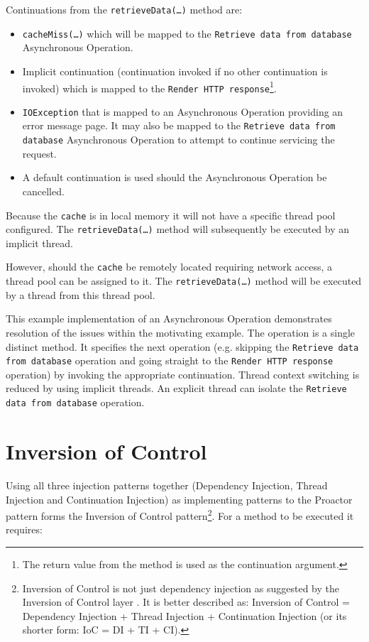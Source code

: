 \documentclass[prodmode]{style/acmlarge}
\begin{document}
Continuations from the \texttt{retrieveData(\ldots)} method are:
\begin{itemize}
  \item \texttt{cacheMiss(\ldots)} which will be mapped to the \texttt{Retrieve data from database} Asynchronous Operation.
  \item Implicit continuation (continuation invoked if no other continuation is invoked) which is mapped to the \texttt{Render HTTP response}\footnote{The return value from the method is used as the continuation argument.}.
  \item \texttt{IOException} that is mapped to an Asynchronous Operation providing an error message page.  It may also be mapped to the \texttt{Retrieve data from database} Asynchronous Operation to attempt to continue servicing the request.
  \item A default continuation is used should the Asynchronous Operation be cancelled.
\end{itemize}

Because the \texttt{cache} is in local memory it will not have a specific thread
pool configured.  The \texttt{retrieveData(\ldots)} method will subsequently be
executed by an implicit thread.

However, should the \texttt{cache} be remotely located requiring network access,
a thread pool can be assigned to it.  The \texttt{retrieveData(\ldots)} method
will be executed by a thread from this thread pool.

This example implementation of an Asynchronous Operation demonstrates resolution
of the issues within the motivating example.  The operation is a single distinct
method.  It specifies the next operation (e.g. skipping the \texttt{Retrieve
data from database} operation and going straight to the \texttt{Render HTTP
response} operation) by invoking the appropriate continuation.  Thread context
switching is reduced by using implicit threads.  An explicit thread can isolate the
\texttt{Retrieve data from database} operation.


\section{Inversion of Control}

Using all three injection patterns together (Dependency Injection, Thread
Injection and Continuation Injection) as implementing patterns to the Proactor
pattern forms the Inversion of Control pattern\footnote{Inversion of Control is
not just dependency injection as suggested by the Inversion of Control layer
\cite{ioc}.  It is better described as: Inversion of Control = Dependency
Injection + Thread Injection + Continuation Injection (or its shorter form: IoC
= DI + TI + CI).}.  For a method to be executed it requires:
\end{document}
